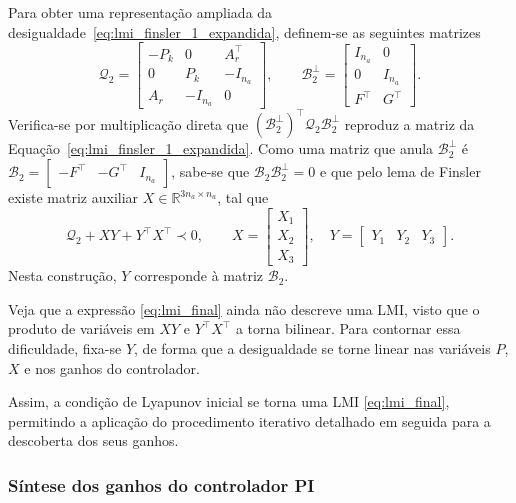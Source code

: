 Para obter uma representação ampliada da desigualdade~\eqref{eq:lmi_finsler_1_expandida}, definem-se as seguintes matrizes
\begin{equation}
    \mathcal Q_2=\begin{bmatrix}
    -P_k&0&A_r^\top\\
    0&P_{k}&-I_{n_a}\\
    A_r&-I_{n_a}&0
    \end{bmatrix},\qquad
    \mathcal B_2^\perp=\begin{bmatrix}
    I_{n_a}&0\\0&I_{n_a}\\F^\top&G^\top
    \end{bmatrix}.
    \label{eq:lmi_q2}
\end{equation}
Verifica-se por multiplicação direta que $(\mathcal B_2^\perp)^\top\mathcal Q_2\mathcal B_2^\perp$ reproduz a matriz da Equação~\eqref{eq:lmi_finsler_1_expandida}. Como uma matriz que anula $\mathcal B_2^\perp$ é $\mathcal B_2=\begin{bmatrix}-F^\top&-G^\top&I_{n_a}\end{bmatrix}$, sabe-se que $\mathcal B_2\mathcal B_2^\perp=0$ e que pelo lema de Finsler existe matriz auxiliar $X\in\mathbb R^{3n_a\times n_a}$, tal que
\begin{equation}
    \boxed{\mathcal Q_2+XY+Y^\top X^\top\prec0,}
    \qquad
    X=\begin{bmatrix}X_1\\X_2\\X_3\end{bmatrix},\quad
    Y=\begin{bmatrix}Y_1&Y_2&Y_3\end{bmatrix}.
    \label{eq:lmi_final}
\end{equation}
Nesta construção, $Y$ corresponde à matriz $\mathcal B_2$. 

\noindent
Veja que a expressão \eqref{eq:lmi_final} ainda não descreve uma LMI, visto que o produto de variáveis em $XY$ e $Y^\top X^\top$ a torna bilinear. Para contornar essa dificuldade, fixa-se $Y$, de forma que a desigualdade se torne linear nas variáveis $P$, $X$ e nos ganhos do controlador.

\noindent
Assim, a condição de Lyapunov inicial se torna uma LMI \eqref{eq:lmi_final}, permitindo a aplicação do procedimento iterativo detalhado em seguida para a descoberta dos seus ganhos.

\subsubsection{Síntese dos ganhos do controlador PI}

